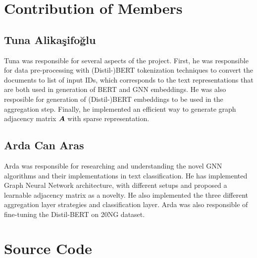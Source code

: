 \begin{appendices}
    \section{Contribution of Members}
    \subsection{Tuna Alikaşifoğlu}
    Tuna was responsible for several aspects of the project. First, he was responsible for data pre-processing with (Distil-)BERT tokenization techniques to convert the documents to list of input IDs, which corresponds to the text representations that are both used in generation of BERT and GNN embeddings. He was also resposible for generation of (Distil-)BERT embeddings to be used in the aggregation step. Finally, he implemented an efficient way to generate graph adjacency matrix $\boldsymbol{A}$ with sparse representation. 
    
    \subsection{Arda Can Aras} 
    Arda was responsible for researching and understanding the novel GNN algorithms and their implementations in text classification. He has implemented Graph Neural Network architecture, with different setups and proposed a learnable adjacency matrix  as a novelty. He also implemented the three different aggregation layer strategies and classification layer. Arda was also responsible of fine-tuning the Distil-BERT on 20NG dataset.
    \clearpage
    
    \onecolumn
    \section{Source Code}
\end{appendices}

